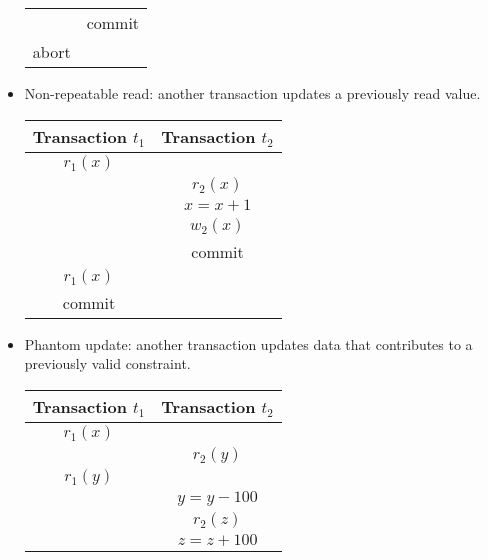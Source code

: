 \begin{itemize}
\begin{table}[H]
\begin{tabular}{c|c}
                                    & commit                     \\
            abort                      &                           
            \end{tabular}
        \end{table}
    \item Non-repeatable read: another transaction updates a previously read value.
        \begin{table}[H]
            \centering
            \begin{tabular}{c|c}
            \textbf{Transaction $t_1$}  & \textbf{Transaction $t_2$} \\ \hline
            $r_1(x)$                    &                            \\
                                        & $r_2(x)$                   \\
                                        & $x=x+1$                    \\
                                        & $w_2(x)$                   \\
                                        & commit                     \\
            $r_1(x)$                    &                            \\
            commit                      & \multicolumn{1}{l}{}      
            \end{tabular}
        \end{table}
    \item Phantom update: another transaction updates data that contributes to a previously valid constraint.
        \begin{table}[H]
            \centering
            \begin{tabular}{c|c}
            \textbf{Transaction $t_1$} & \textbf{Transaction $t_2$} \\ \hline
            $r_1(x)$                   &                            \\
                                        & $r_2(y)$                   \\
            $r_1(y)$                   &                            \\
                                        & $y=y-100$                  \\
                                        & $r_2(z)$                   \\
                                        & $z=z+100$                  \\

\end{tabular}
\end{table}
\end{itemize}
